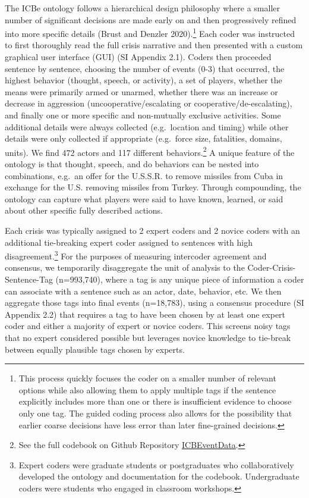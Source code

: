 \documentclass{article}
\begin{document}
The ICBe ontology follows a hierarchical design philosophy where a
smaller number of significant decisions are made early on and then
progressively refined into more specific details (Brust and Denzler
2020).\footnote{This process quickly focuses the coder on a smaller
  number of relevant options while also allowing them to apply multiple
  tags if the sentence explicitly includes more than one or there is
  insufficient evidence to choose only one tag. The guided coding
  process also allows for the possibility that earlier coarse decisions
  have less error than later fine-grained decisions.} Each coder was
instructed to first thoroughly read the full crisis narrative and then
presented with a custom graphical user interface (GUI) (SI Appendix
2.1). Coders then proceeded sentence by sentence, choosing the number of
events (0-3) that occurred, the highest behavior (thought, speech, or
activity), a set of players, whether the means were primarily armed or
unarmed, whether there was an increase or decrease in aggression
(uncooperative/escalating or cooperative/de-escalating), and finally one
or more specific and non-mutually exclusive activities. Some additional
details were always collected (e.g.~location and timing) while other
details were only collected if appropriate (e.g.~force size, fatalities,
domains, units). We find 472 actors and 117 different
behaviors.\footnote{See the full codebook on Github Repository
  \href{https://urldefense.com/v3/__https://github.com/CenterForPeaceAndSecurityStudies/ICBEventData__;!!Mih3wA!WxDJtEczKfxGTh0S2Krunap8ReymFEL5iTWaSfOHeqlSdyfRx77zmjBSWO1OAm13$}{ICBEventData}.}
A unique feature of the ontology is that thought, speech, and do
behaviors can be nested into combinations, e.g.~an offer for the
U.S.S.R. to remove missiles from Cuba in exchange for the U.S. removing
missiles from Turkey. Through compounding, the ontology can capture what
players were said to have known, learned, or said about other specific
fully described actions.

Each crisis was typically assigned to 2 expert coders and 2 novice
coders with an additional tie-breaking expert coder assigned to
sentences with high disagreement.\footnote{Expert coders were graduate
  students or postgraduates who collaboratively developed the ontology
  and documentation for the codebook. Undergraduate coders were students
  who engaged in classroom workshops.} For the purposes of measuring
intercoder agreement and consensus, we temporarily disaggregate the unit
of analysis to the Coder-Crisis-Sentence-Tag (n=993,740), where a tag is
any unique piece of information a coder can associate with a sentence
such as an actor, date, behavior, etc. We then aggregate those tags into
final events (n=18,783), using a consensus procedure (SI Appendix 2.2)
that requires a tag to have been chosen by at least one expert coder and
either a majority of expert or novice coders. This screens noisy tags
that no expert considered possible but leverages novice knowledge to
tie-break between equally plausible tags chosen by experts.
\end{document}
